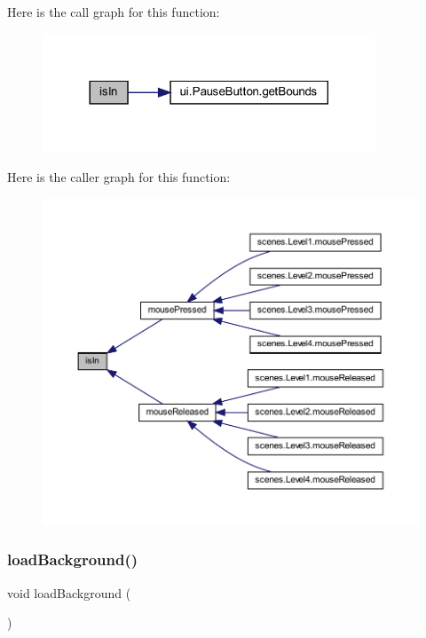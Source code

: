 Here is the call graph for this function\+:\nopagebreak
\begin{figure}[H]
\begin{center}
\leavevmode
\includegraphics[width=281pt]{classui_1_1_pause_overlay_a1652ba7734cc8d8ba710d3ab10281b04_cgraph}
\end{center}
\end{figure}
Here is the caller graph for this function\+:\nopagebreak
\begin{figure}[H]
\begin{center}
\leavevmode
\includegraphics[width=350pt]{classui_1_1_pause_overlay_a1652ba7734cc8d8ba710d3ab10281b04_icgraph}
\end{center}
\end{figure}
\mbox{\label{classui_1_1_pause_overlay_ab9e42b0ec1e9c9ffdf1edd5dec1b0ddd}} 
\subsubsection{\texorpdfstring{load\+Background()}{loadBackground()}}
{\footnotesize\ttfamily void load\+Background (\begin{DoxyParamCaption}{ }\end{DoxyParamCaption})\hspace{0.3cm}{\ttfamily [private]}}



